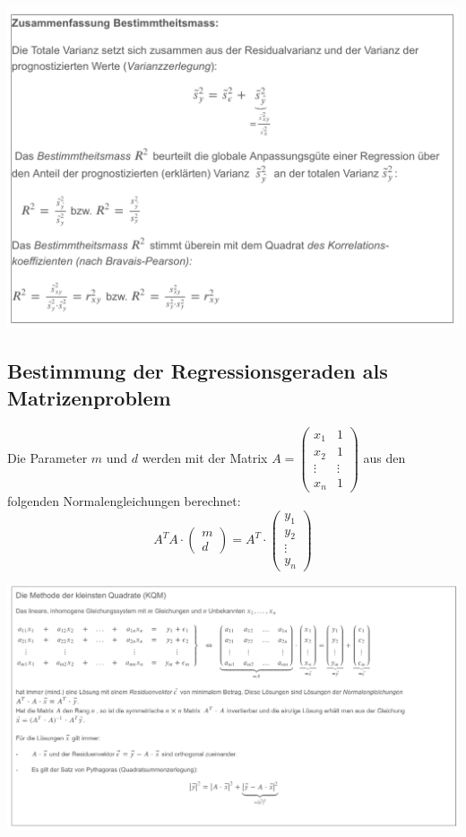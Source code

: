 \begin{center}
    \includegraphics[width=1\linewidth]{images/regression3.png}
\end{center}
\subsection{Bestimmung der Regressionsgeraden als Matrizenproblem}
\label{sec:regressionsgerade}
Die Parameter $m$ und $d$ werden mit der Matrix $A = \begin{pmatrix} x_1 & 1 \\ x_2 & 1 \\ \vdots & \vdots \\ x_n & 1 \end{pmatrix}$ aus den folgenden Normalengleichungen berechnet:
\begin{equation*}
    A^T A \cdot \begin{pmatrix} m \\ d \end{pmatrix} = A^T \cdot \begin{pmatrix} y_1 \\ y_2 \\ \vdots \\ y_n \end{pmatrix}
\end{equation*}
\begin{center}
    \includegraphics[width=1\linewidth]{images/regression4.png}
\end{center}
